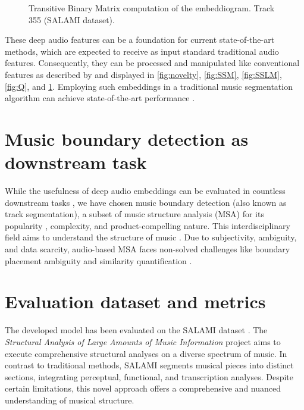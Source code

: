 \begin{figure}[ht]
\begin{minipage}{0.45\textwidth}
        \caption[Track 355 (SALAMI dataset). Transitive Binary Similarity Matrix]{Transitive Binary Matrix computation of the embeddiogram. Track 355 (SALAMI dataset).}
        \label{fig:TBSM}
    \end{minipage}
\end{figure}


These deep audio features can be a foundation for current state-of-the-art methods, which are expected to receive as input standard traditional audio features. Consequently, they can be processed and manipulated like conventional features as described by \cite{unsuperMSA} and displayed in \ref{fig:novelty}, \ref{fig:SSM}, \ref{fig:SSLM}, \ref{fig:Q}, and \ref{fig:TBSM}. Employing such embeddings in a traditional music segmentation algorithm can achieve state-of-the-art performance \cite{deepfeaturesegment}.


\section{Music boundary detection as downstream task}

While the usefulness of deep audio embeddings can be evaluated in countless downstream tasks \cite{Li2023MERT:Training, Kim2020OneStrategies}, we have chosen music boundary detection (also known as track segmentation), a subset of music structure analysis (MSA) for its popularity \cite{Smith2013ATask}, complexity, and product-compelling nature. This interdisciplinary field aims to understand the structure of music \cite{Nieto2020Audio-BasedApplications}. Due to subjectivity, ambiguity, and data scarcity, audio-based MSA faces non-solved challenges like boundary placement ambiguity and similarity quantification \cite{NietoPerceptualMusic}.  


\section{Evaluation dataset and metrics}

The developed model has been evaluated on the SALAMI dataset \cite{Smith2011DESIGNANNOTATIONS}. The \textit{Structural Analysis of Large Amounts of Music Information} project aims to execute comprehensive structural analyses on a diverse spectrum of music. In contrast to traditional methods, SALAMI segments musical pieces into distinct sections, integrating perceptual, functional, and transcription analyses. Despite certain limitations, this novel approach offers a comprehensive and nuanced understanding of musical structure.

